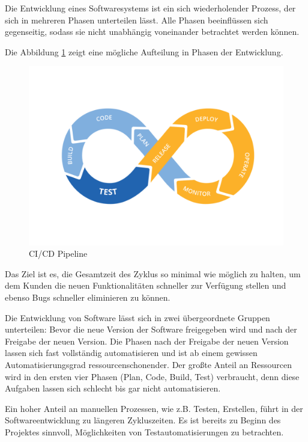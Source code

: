 Die Entwicklung eines Softwaresystems ist ein sich wiederholender Prozess, der sich in mehreren Phasen unterteilen lässt.
Alle Phasen beeinflüssen sich gegenseitig, sodass sie nicht unabhängig voneinander betrachtet werden können.

Die Abbildung \ref{fig:workflowCiCd} zeigt eine mögliche Aufteilung in Phasen der Entwicklung. 
\begin{figure}[H]
    \centering
    \includegraphics[width=1\textwidth]{../images/CiCD.png}
    \caption[CI/CD Pipeline]{CI/CD Pipeline \footnotemark}
    \label{fig:workflowCiCd}
\end{figure}

Das Ziel ist es, die Gesamtzeit des Zyklus so minimal wie möglich zu halten, um dem Kunden die neuen Funktionalitäten schneller zur Verfügung stellen und ebenso
Bugs schneller eliminieren zu können.



Die Entwicklung von Software lässt sich in zwei übergeordnete Gruppen unterteilen:
Bevor die neue Version der Software freigegeben 
wird und nach der Freigabe der neuen Version.
Die Phasen nach der Freigabe der neuen Version lassen sich fast vollständig automatisieren 
und ist ab einem gewissen Automatisierungsgrad ressourcenschonender.
Der großte Anteil an Ressourcen wird in den ersten vier Phasen (Plan, Code, Build, Test) verbraucht, 
denn diese Aufgaben lassen sich schlecht bis gar nicht automatisieren. 

Ein hoher Anteil an manuellen Prozessen, wie z.B. Testen, Erstellen, führt in der Softwareentwicklung 
zu längeren Zykluszeiten. Es ist bereits zu Beginn des Projektes sinnvoll, Möglichkeiten von Testautomatisierungen zu betrachten.

